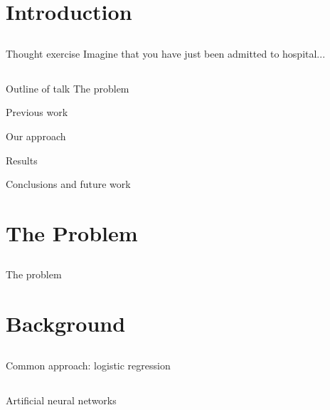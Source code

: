 \documentclass[compress]{beamer}
\begin{document}

\section{Introduction}
\subsection{}
\begin{frame}{Thought exercise}
Imagine that you have just been admitted to hospital...
\end{frame}

\subsection{}
\begin{frame}{Outline of talk}
The problem

Previous work

Our approach

Results

Conclusions and future work
\end{frame}

\section{The Problem}
\subsection{}
\begin{frame}{The problem}
\end{frame}

\section{Background}
\subsection{}
\begin{frame}{Common approach: logistic regression}
\end{frame}

\subsection{}
\begin{frame}{Artificial neural networks}
\end{frame}
\end{document}
